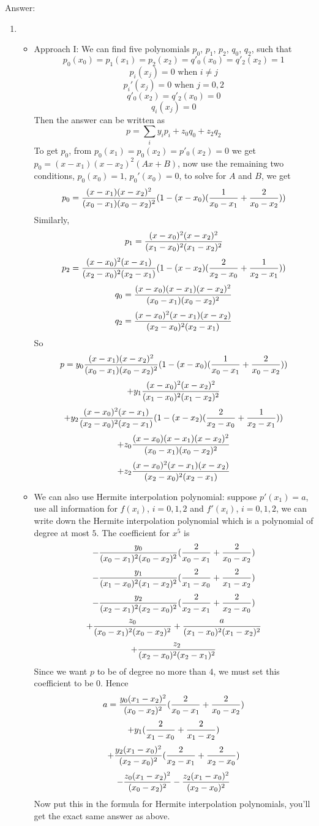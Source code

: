 \documentclass[20pt]{article} %
\theoremstyle{break}
\begin{document}
Answer:\\

\begin{enumerate}
\item \begin{itemize}
  \item Approach I: We can find five polynomials $p_0$, $p_1$, $p_2$, $q_0$, $q_2$, such that
    \[p_0(x_0)=p_1(x_1)=p_2(x_2)=q'_0(x_0)=q'_2(x_2)=1\]
    \[p_i(x_j)=0\text{ when }i\not=j\]
    \[p_i'(x_j)=0\text{ when }j=0, 2\]
    \[q'_0(x_2)=q'_2(x_0)=0\]
    \[q_i(x_j)=0\]
    Then the answer can be written as
    \[p=\sum_iy_ip_i+z_0q_0+z_2q_2\]
    To get $p_0$, from $p_0(x_1)=p_0(x_2)=p'_0(x_2)=0$ we get $p_0=(x-x_1)(x-x_2)^2(Ax+B)$, now use the remaining two conditions, $p_0(x_0)=1$, $p_0'(x_0)=0$, to solve for $A$ and $B$, we get
    \[p_0={(x-x_1)(x-x_2)^2\over (x_0-x_1)(x_0-x_2)^2}(1-(x-x_0)({1\over x_0-x_1}+{2\over x_0-x_2}))\]
    Similarly,
    \[p_1={(x-x_0)^2(x-x_2)^2\over (x_1-x_0)^2(x_1-x_2)^2}\]
    \[p_2={(x-x_0)^2(x-x_1)\over (x_2-x_0)^2(x_2-x_1)}(1-(x-x_2)({2\over x_2-x_0}+{1\over x_2-x_1}))\]
    \[q_0={(x-x_0)(x-x_1)(x-x_2)^2\over (x_0-x_1)(x_0-x_2)^2}\]
    \[q_2={(x-x_0)^2(x-x_1)(x-x_2)\over (x_2-x_0)^2(x_2-x_1)}\]
    So
    \[p=y_0{(x-x_1)(x-x_2)^2\over (x_0-x_1)(x_0-x_2)^2}(1-(x-x_0)({1\over x_0-x_1}+{2\over x_0-x_2}))\]
    \[+y_1{(x-x_0)^2(x-x_2)^2\over (x_1-x_0)^2(x_1-x_2)^2}\]
    \[+y_2{(x-x_0)^2(x-x_1)\over (x_2-x_0)^2(x_2-x_1)}(1-(x-x_2)({2\over x_2-x_0}+{1\over x_2-x_1}))\]
    \[+z_0{(x-x_0)(x-x_1)(x-x_2)^2\over (x_0-x_1)(x_0-x_2)^2}\]
    \[+z_2{(x-x_0)^2(x-x_1)(x-x_2)\over (x_2-x_0)^2(x_2-x_1)}\]
  \item We can also use Hermite interpolation polynomial: suppose $p'(x_1)=a$, use all information for $f(x_i)$, $i=0, 1, 2$ and $f'(x_i)$, $i=0, 1, 2$, we can write down the Hermite interpolation polynomial which is a polynomial of degree at most $5$. The coefficient for $x^5$ is
    \[-{y_0\over (x_0-x_1)^2(x_0-x_2)^2}({2\over x_0-x_1}+{2\over x_0-x_2})\]
    \[-{y_1\over (x_1-x_0)^2(x_1-x_2)^2}({2\over x_1-x_0}+{2\over x_1-x_2})\]
    \[-{y_2\over (x_2-x_1)^2(x_2-x_0)^2}({2\over x_2-x_1}+{2\over x_2-x_0})\]
    \[+{z_0\over (x_0-x_1)^2(x_0-x_2)^2}+{a\over (x_1-x_0)^2(x_1-x_2)^2}\]
    \[+{z_2\over (x_2-x_0)^2(x_2-x_1)^2}\]
    Since we want $p$ to be of degree no more than $4$, we must set this coefficient to be $0$. Hence
    \[a={y_0(x_1-x_2)^2\over (x_0-x_2)^2}({2\over x_0-x_1}+{2\over x_0-x_2})\]
      \[+y_1({2\over x_1-x_0}+{2\over x_1-x_2})\]
      \[+{y_2(x_1-x_0)^2\over (x_2-x_0)^2}({2\over x_2-x_1}+{2\over x_2-x_0})\]
      \[-{z_0(x_1-x_2)^2\over (x_0-x_2)^2}-{z_2(x_1-x_0)^2\over (x_2-x_0)^2}\]
      Now put this in the formula for Hermite interpolation polynomials, you'll get the exact same answer as above.
 \end{itemize}


\end{enumerate}
\end{document}
